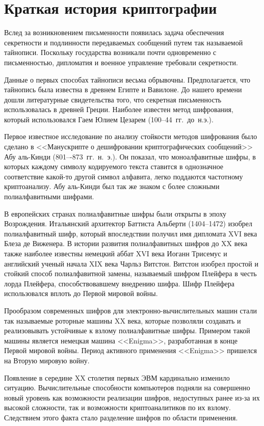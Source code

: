 \section{Краткая история криптографии}

Вслед за возникновением письменности появилась задача обеспечения секретности и подлинности передаваемых сообщений путем так называемой тайнописи. Поскольку государства возникали почти одновременно с письменностью, дипломатия и военное управление требовали секретности.

Данные о первых способах тайнописи весьма обрывочны. Предполагается, что тайнопись была известна в древнем Египте и Вавилоне. До нашего времени дошли литературные свидетельства того, что секретная письменность использовалась в древней Греции. Наиболее известен метод шифрования, который использовался Гаем Юлием Цезарем (100--44~гг.~до~н.э.).

Первое известное исследование по анализу стойкости методов шифрования было сделано в <<Манускрипте о дешифровании криптографических сообщений>> Абу аль-Кинди (801–-873~гг.~н.~э.). Он показал, что моноалфавитные шифры, в которых каждому символу кодируемого текста ставится в однозначное соответствие какой-то другой символ алфавита, легко поддаются частотному криптоанализу. Абу аль-Кинди был так же знаком с более сложными полиалфавитными шифрами.

В европейских странах полиалфавитные шифры были открыты в эпоху Возрождения. Итальянский архитектор Баттиста Альберти (1404--1472) изобрел полиалфавитный шифр, который впоследствии получил имя дипломата XVI века Блеза де Виженера. В истории развития полиалфавитных шифров до XX века также наиболее известны немецкий аббат XVI века Иоганн Трисемус и английский ученый начала XIX века Чарльз Витстон. Витстон изобрел простой и стойкий способ полиалфавитной замены, называемый шифром Плейфера в честь лорда Плейфера, способствовавшему внедрению шифра. Шифр Плейфера использовался вплоть до Первой мировой войны.

Прообразом современных шифров для электронно-вычислительных машин стали так называемые роторные машины XX века, которые позволяли создавать и реализовывать устойчивые к взлому полиалфавитные шифры. Примером такой машины является немецкая машина <<Enigma>>, разработанная в конце Первой мировой войны. Период активного применения <<Enigma>> пришелся на Вторую мировую войну.

Появление в середине XX столетия первых ЭВМ кардинально изменило ситуацию. Вычислительные способности компьютеров подняли на совершенно новый уровень как возможности реализации шифров, недоступных ранее из-за их высокой сложности, так и возможности криптоаналитиков по их взлому. Следствием этого факта стало разделение шифров по области применения.

